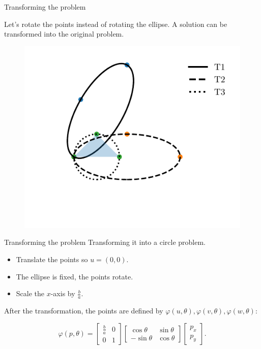 \documentclass{beamer}
\begin{document}
\begin{frame}{Transforming the problem}
	
	Let's rotate the points instead of rotating the ellipse. A solution can be transformed into the original problem.
	
	\begin{figure}
		\centering
		\includegraphics{circumscribed-circle}
		\caption{}
		\label{fig:circumscribed-circle}
	\end{figure}
\end{frame}

\begin{frame}{Transforming the problem}
	Transforming it into a circle problem.
	
	\begin{itemize}
		\item Translate the points so $u=(0, 0)$.
		\item The ellipse is fixed, the points rotate.
		\item Scale the $x$-axis by $\frac{b}{a}$.
	\end{itemize}

	After the transformation, the points are defined by $\varphi(u, \theta), \varphi(v, \theta), \varphi(w, \theta)$:
	
	\begin{equation*}\label{eq:trpnts}
	\varphi(p, \theta)=\left[\begin{array}{cc}
	\frac{b}{a}&0\\
	0&1
	\end{array}\right]
	\left[\begin{array}{cc}
	\cos{\theta}&\sin{\theta}\\
	-\sin{\theta}&\cos{\theta}
	\end{array}\right]\left[\begin{array}{c}
	p_x\\
	p_y
	\end{array}\right].
	\end{equation*}
\end{frame}
	
\end{document}
